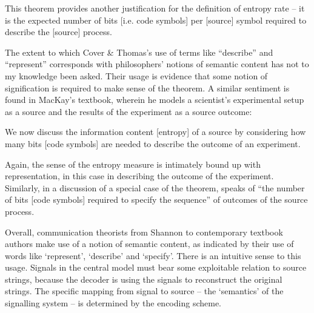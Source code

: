 \documentclass[12pt]{article}
\begin{document}
\begin{myquote}
This theorem provides another justification for the definition of entropy rate -- it is the expected number of bits [i.e. code symbols] per [source] symbol required to describe the [source] process.
\par\hspace*{\fill}\citet[115]{cover2006elements}
\end{myquote}


\noindent The extent to which Cover \& Thomas's use of terms like ``describe'' and ``represent'' corresponds with philosophers' notions of semantic content has not to my knowledge been asked.
Their usage is evidence that some notion of signification is required to make sense of the theorem.
A similar sentiment is found in MacKay's textbook, wherein he models a scientist's experimental setup as a source and the results of the experiment as a source outcome:

\begin{myquote}
We now discuss the information content [entropy] of a source by considering how many bits [code symbols] are needed to describe the outcome of an experiment.
\par\hspace*{\fill}\citet[73]{mackay2003information}
\end{myquote}

\noindent Again, the sense of the entropy measure is intimately bound up with representation, in this case in describing the outcome of the experiment.
Similarly, in a discussion of a special case of the theorem, \citet[397]{shannon1948mathematicalc} speaks of ``the number of bits [code symbols] required to specify the sequence'' of outcomes of the source process.

Overall, communication theorists from Shannon to contemporary textbook authors make use of a notion of semantic content, as indicated by their use of words like `represent', `describe' and `specify'.
There is an intuitive sense to this usage.
Signals in the central model must bear some exploitable relation to source strings, because the decoder is using the signals to reconstruct the original strings.
The specific mapping from signal to source -- the `semantics' of the signalling system -- is determined by the encoding scheme.
\end{document}
